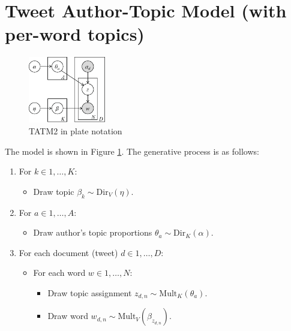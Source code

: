 \documentclass[12pt,abstracton,a4paper]{scrartcl}
\begin{document}

\section{Tweet Author-Topic Model (with per-word topics)}

\begin{figure}[tb]
    \centering
    \includegraphics[width=0.3\textwidth]{TATM2.eps}
    \caption{TATM2 in plate notation}
    \label{fig:TATM2}
\end{figure}

The model is shown in Figure \ref{fig:TATM2}. The generative process is as follows:

\begin{enumerate}
	\item For $k \in {1, \ldots, K}$:
	\begin{itemize}
		\item Draw topic $\beta_k \sim \text{Dir}_V(\eta)$.
	\end{itemize}
	\item For $a \in {1, \ldots, A}$:
	\begin{itemize}
		\item Draw author's topic proportions $\theta_a \sim \text{Dir}_K(\alpha)$.
	\end{itemize}
  \item For each document (tweet) $d \in {1, \ldots, D}$:
	\begin{itemize}
		\item For each word $w \in {1, \ldots, N}$:
		\begin{itemize}
			\item Draw topic assignment $z_{d,n} \sim \text{Mult}_K(\theta_a)$.
			\item Draw word $w_{d,n} \sim \text{Mult}_V(\beta_{z_{d,n}})$.
		\end{itemize}
	\end{itemize}
\end{enumerate}
\end{document}
